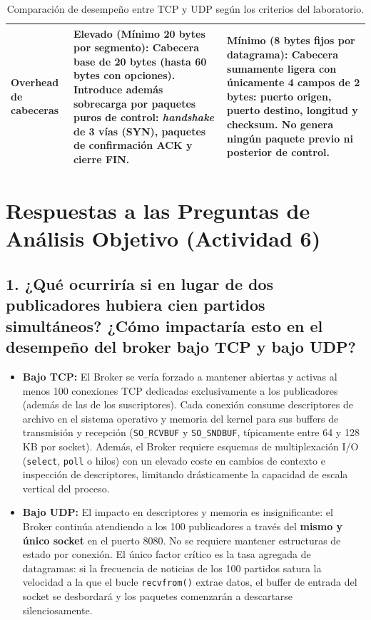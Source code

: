 \documentclass[11pt,a4paper]{article}
\begin{document}
\begin{table}[H]
\begin{tabularx}{\textwidth}{|l|X|X|}
        \textbf{Overhead de cabeceras} & 
        \textbf{Elevado (Mínimo 20 bytes por segmento):} Cabecera base de 20 bytes (hasta 60 bytes con opciones). Introduce además sobrecarga por paquetes puros de control: \textit{handshake} de 3 vías (SYN), paquetes de confirmación ACK y cierre FIN. & 
        \textbf{Mínimo (8 bytes fijos por datagrama):} Cabecera sumamente ligera con únicamente 4 campos de 2 bytes: puerto origen, puerto destino, longitud y checksum. No genera ningún paquete previo ni posterior de control. \\ \hline
    \end{tabularx}
    \caption{Comparación de desempeño entre TCP y UDP según los criterios del laboratorio.}
    \label{tab:desempeno_tcp_udp}
\end{table}

\newpage
\section{Respuestas a las Preguntas de Análisis Objetivo (Actividad 6)}

\subsection{1. ¿Qué ocurriría si en lugar de dos publicadores hubiera cien partidos simultáneos? ¿Cómo impactaría esto en el desempeño del broker bajo TCP y bajo UDP?}
\begin{itemize}
    \item \textbf{Bajo TCP:} El Broker se vería forzado a mantener abiertas y activas al menos 100 conexiones TCP dedicadas exclusivamente a los publicadores (además de las de los suscriptores). Cada conexión consume descriptores de archivo en el sistema operativo y memoria del kernel para sus buffers de transmisión y recepción (\texttt{SO\_RCVBUF} y \texttt{SO\_SNDBUF}, típicamente entre 64 y 128 KB por socket). Además, el Broker requiere esquemas de multiplexación I/O (\texttt{select}, \texttt{poll} o hilos) con un elevado coste en cambios de contexto e inspección de descriptores, limitando drásticamente la capacidad de escala vertical del proceso.
    \item \textbf{Bajo UDP:} El impacto en descriptores y memoria es insignificante: el Broker continúa atendiendo a los 100 publicadores a través del \textbf{mismo y único socket} en el puerto 8080. No se requiere mantener estructuras de estado por conexión. El único factor crítico es la tasa agregada de datagramas: si la frecuencia de noticias de los 100 partidos satura la velocidad a la que el bucle \texttt{recvfrom()} extrae datos, el buffer de entrada del socket se desbordará y los paquetes comenzarán a descartarse silenciosamente.
\end{itemize}
\end{document}
